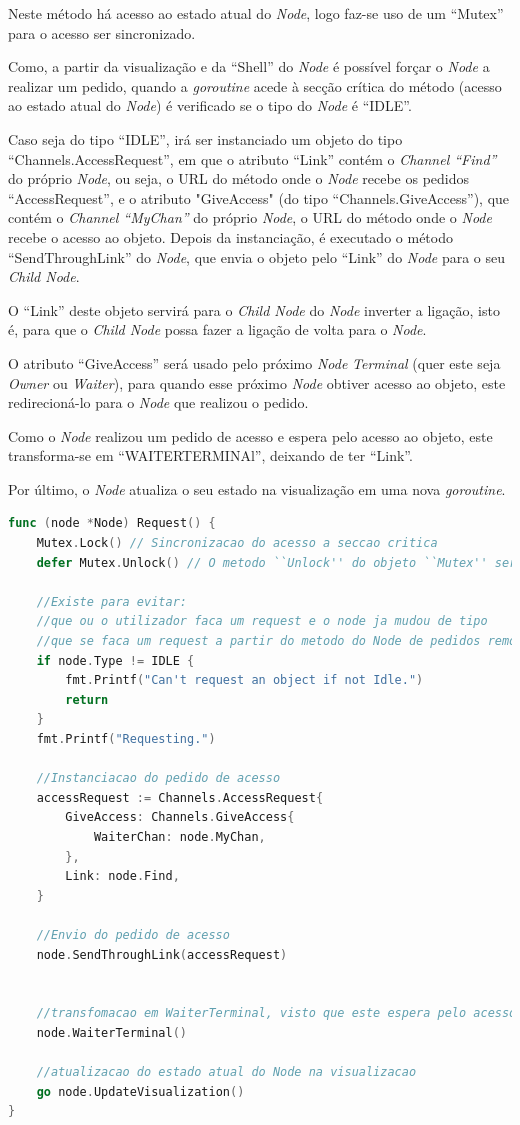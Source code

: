 Neste método há acesso ao estado atual do \emph{Node},
logo faz-se uso de um ``Mutex'' para o acesso ser sincronizado.

Como, a partir da visualização e da ``Shell'' do \emph{Node} é possível forçar o \emph{Node} 
a realizar um pedido, quando a \emph{goroutine} acede à secção crítica do método (acesso ao estado atual do \emph{Node})
é verificado se o tipo do \emph{Node} é ``IDLE''.


Caso seja do tipo ``IDLE'', irá ser instanciado um objeto do tipo ``Channels.AccessRequest'', em que o atributo
``Link'' contém o \emph{Channel ``Find''}  do próprio \emph{Node}, ou seja, o \acs{URL} do método
onde o \emph{Node} recebe os pedidos ``AccessRequest'', e
o atributo "GiveAccess" (do tipo ``Channels.GiveAccess''), que contém o \emph{Channel ``MyChan''} do próprio
\emph{Node}, o \acs{URL} do método
onde o \emph{Node} recebe o acesso ao objeto.
Depois da instanciação, é executado o método ``SendThroughLink'' do \emph{Node}, que envia o objeto 
pelo ``Link'' do \emph{Node} para o seu \emph{Child Node}.

O ``Link'' deste objeto servirá para o \emph{Child Node} do \emph{Node} inverter a ligação, isto é, 
para que o \emph{Child Node} possa fazer a ligação de volta para o \emph{Node}.

O atributo ``GiveAccess'' será usado pelo próximo \emph{Node} \emph{Terminal} (quer este seja \emph{Owner} ou \emph{Waiter}), 
para quando esse próximo \emph{Node} obtiver acesso ao objeto, este redirecioná-lo para o \emph{Node} que realizou o pedido.

Como o \emph{Node} realizou um pedido de acesso e espera pelo acesso ao objeto, este transforma-se em 
``WAITER\textunderscore TERMINAl'', deixando de ter ``Link''.

Por último, o \emph{Node} atualiza o seu estado na visualização em uma nova \emph{goroutine}.


\begin{lstlisting}[caption={Método ``Request''},language=Go]
func (node *Node) Request() {
	Mutex.Lock() // Sincronizacao do acesso a seccao critica
	defer Mutex.Unlock() // O metodo ``Unlock'' do objeto ``Mutex'' sera executado caso o metodo ``Request'' termine

	//Existe para evitar:
	//que ou o utilizador faca um request e o node ja mudou de tipo
	//que se faca um request a partir do metodo do Node de pedidos remotos
	if node.Type != IDLE {
		fmt.Printf("Can't request an object if not Idle.")
		return
	}
	fmt.Printf("Requesting.")

	//Instanciacao do pedido de acesso
	accessRequest := Channels.AccessRequest{
		GiveAccess: Channels.GiveAccess{
			WaiterChan: node.MyChan,
		},
		Link: node.Find,
	}

	//Envio do pedido de acesso
	node.SendThroughLink(accessRequest)


	//transfomacao em WaiterTerminal, visto que este espera pelo acesso
	node.WaiterTerminal()

	//atualizacao do estado atual do Node na visualizacao
	go node.UpdateVisualization()
}
\end{lstlisting}


